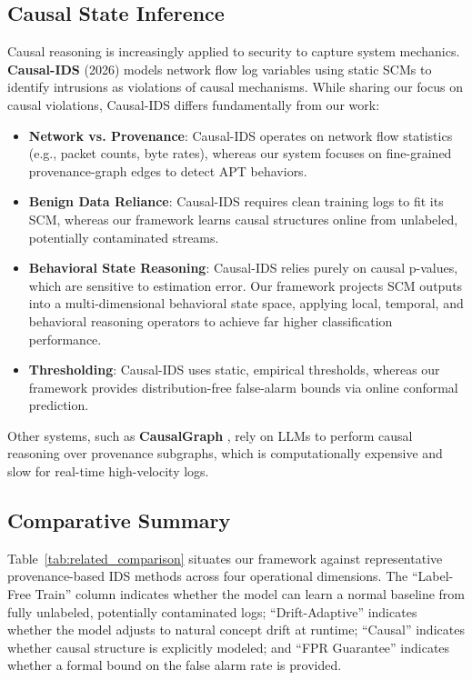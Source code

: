 \subsection{Causal State Inference}
Causal reasoning is increasingly applied to security to capture system mechanics. \textbf{Causal-IDS} (2026) \cite{causalids2026} models network flow log variables using static SCMs to identify intrusions as violations of causal mechanisms. While sharing our focus on causal violations, Causal-IDS differs fundamentally from our work:
\begin{itemize}
\item \textbf{Network vs. Provenance}: Causal-IDS operates on network flow statistics (e.g., packet counts, byte rates), whereas our system focuses on fine-grained provenance-graph edges to detect APT behaviors.
\item \textbf{Benign Data Reliance}: Causal-IDS requires clean training logs to fit its SCM, whereas our framework learns causal structures online from unlabeled, potentially contaminated streams.
\item \textbf{Behavioral State Reasoning}: Causal-IDS relies purely on causal p-values, which are sensitive to estimation error. Our framework projects SCM outputs into a multi-dimensional behavioral state space, applying local, temporal, and behavioral reasoning operators to achieve far higher classification performance.
\item \textbf{Thresholding}: Causal-IDS uses static, empirical thresholds, whereas our framework provides distribution-free false-alarm bounds via online conformal prediction.
\end{itemize}

Other systems, such as \textbf{CausalGraph} \cite{causalgraph2026}, rely on LLMs to perform causal reasoning over provenance subgraphs, which is computationally expensive and slow for real-time high-velocity logs.

\subsection{Comparative Summary}
Table~\ref{tab:related_comparison} situates our framework against representative provenance-based IDS methods across four operational dimensions. The ``Label-Free Train'' column indicates whether the model can learn a normal baseline from fully unlabeled, potentially contaminated logs; ``Drift-Adaptive'' indicates whether the model adjusts to natural concept drift at runtime; ``Causal'' indicates whether causal structure is explicitly modeled; and ``FPR Guarantee'' indicates whether a formal bound on the false alarm rate is provided.

